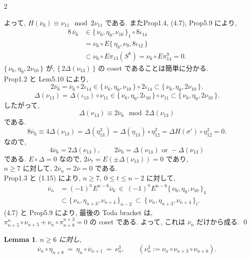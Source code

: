 \documentclass[10pt, leqno]{ltjsarticle}
\newcommand{\toda}[1]{\{\,#1\,\}}              %
\newcommand{\todai}[2][]{\{\,#2\,\}_{#1}}      %
\newcommand{\gen}[1]{\{\,#1\,\}}       %
\newcommand{\pis}[2]{\pi_{#1}(#2)}       %
\newcommand{\pit}[2]{\pi_{#1}^{#2}}
\numberwithin{equation}{section}
\theoremstyle{plain}
\newtheorem{lemma}[theorem]{Lemma}
\theoremstyle{definition}
\theoremstyle{remark}
\begin{document}
\begin{paracol}{2}

\noindent
よって, \(H(\overline{\nu}_6)\equiv \nu_{11}\mod{2\nu_{11}}\) である. 
またProp1.4, (4.7), Prop5.9 により, 
\[
\begin{align*}
8\,\overline{\nu}_6 
&\in \todai[1]{\nu_6,\eta_9,\nu_{10}}\circ 8\iota_{14}\\
&= \nu_6\circ E\toda{\eta_8, \nu_9, 8\iota_{12}}\\
&\subset \nu_6\circ E\pis{13}{S^8}
= \nu_6\circ E\pit{14}{9} = 0 .
\end{align*}
\]
\(\todai[]{\nu_6, \eta_9, 2\nu_{10}}\) が, 
\(\gen{2\Delta(\nu_{13})}\) 
の coset であることは簡単に分かる. \\
Prop1.2 と Lem5.10 により, 
\[
2\overline{\nu}_6
= \overline{\nu}_6\circ2\iota_{14}
\in \todai[]{\nu_6, \eta_9, \nu_{10}}\circ2\iota_{14}
\subset \todai[]{\nu_6, \eta_9, 2\nu_{10}} .
\]
\[
\Delta(\nu_{13})=\Delta(\iota_{13})\circ \nu_{11}\in
\toda{\nu_6, \eta_9, 2\iota_{10}}\circ \nu_{11}
\subset\toda{\nu_6, \eta_9, 2\nu_{10}}.
\]
したがって,
\[
\Delta(\nu_{13}) \equiv 2\overline{\nu}_6
\mod 2\Delta(\nu_{13})
\]
である. 
\[
8\overline{\nu}_6 
\equiv 4\Delta(\nu_{13})
= \Delta(\eta_{13}^3)
= \Delta(\eta_{13})\circ\eta_{12}^2
= \Delta H(\sigma')\circ \eta_{12}^2
= 0.
\]
なので, 
\[
4\overline{\nu}_6 = 2\Delta(\nu_{13}),\qquad 
2\overline{\nu}_6 = \Delta(\nu_{13}) \text{ or } 
-\Delta(\nu_{13})
\]
である. 
\(E\circ \Delta = 0\) なので, 
\(2\overline{\nu}_7 = E(\pm\Delta(\nu_{13})) = 0\)
であり, \\
\(n\ge7\) に対して, 
\(2\overline{\nu}_n=2\overline{\nu}=0\) である. \\
Prop1.3 と (1.15) により, 
\(n\ge7,\ 0\le t\le n-2\) に対して, 
\[
\begin{align*}
  \overline{\nu}_n 
  &= (-1)^n E^{n-6}\overline{\nu}_6\ 
  \in\ (-1)^n E^{n-6}\todai[4]{\nu_6, \eta_9, \nu_{10}}\\
  &\subset \todai[n-2]{\nu_n, \eta_{n+3}, \nu_{n+4}}\
  \subset\ \todai[t]{\nu_n, \eta_{n+3}, \nu_{n+4}} .
\end{align*}
\]
(4.7) と Prop5.9 により, 最後の Toda bracket は, \\
\(\pit{n+5}{n}\circ\nu_{n+5} 
+ \nu_n\circ\pit{n+8}{n+3} = 0\)
の coset である. 
よって, これは \(\overline{\nu}_n\) だけから成る. 
\qed


\begin{lemma}\label{lem:6.3}
\(n\ge6\) に対し,
\[
\overline\nu_n\circ \eta_{n+8}\ 
=\ \eta_n\circ \overline\nu_{n+1}\ =\ \nu_n^{3},
\qquad (\nu_n^{3}:=\nu_n\circ \nu_{n+3}\circ \nu_{n+6}).
\]
\end{lemma}


\end{paracol}
\end{document}
